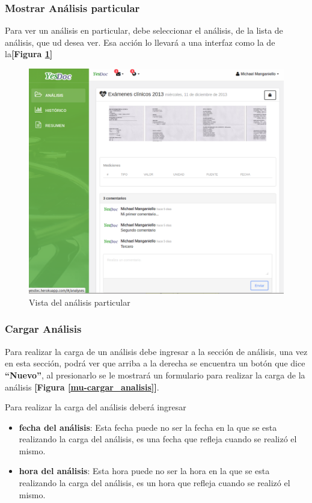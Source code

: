  \subsubsection{Mostrar Análisis particular}
Para ver un análisis en particular, debe seleccionar el análisis, de la lista de análisis, que ud desea ver. Esa acción lo llevará a una interfaz como la de la\textbf{[Figura \ref{mu-analisis_particular}]}
\begin{figure}
	\centering
	\includegraphics[width=.8\textwidth]{img/manual_de_usuario/analisis_particular}
	\caption{Vista del análisis particular}
	\label{mu-analisis_particular}
\end{figure}


 \subsubsection{Cargar Análisis}
 Para realizar la carga de un análisis debe ingresar a la sección de análisis, una vez en esta sección, podrá ver que arriba a la derecha se encuentra un botón que dice \textbf{``Nuevo''}, al presionarlo se le mostrará un formulario para realizar la carga de la análisis \textbf{[Figura \ref{mu-cargar_analisis}]}.
 
 Para realizar la carga del análisis deberá ingresar 
 \begin{itemize}
 	\item  \textbf{fecha del análisis}:  Esta fecha puede no ser la fecha en la que se esta realizando la carga del análisis, es una fecha que refleja cuando se realizó el mismo.
 	\item \textbf{hora del análisis}: Esta hora puede no ser la hora en la que se esta realizando la carga del análisis, es un hora que refleja cuando se realizó el mismo.
 \end{itemize}
 
